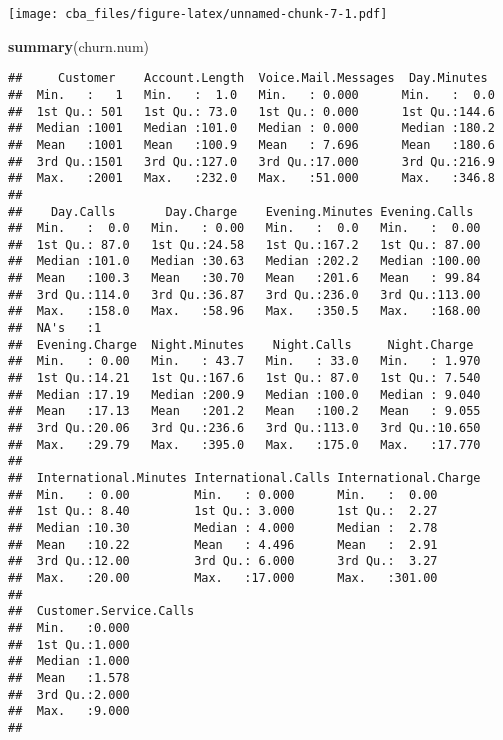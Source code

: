 \documentclass[]{article}
\newenvironment{Shaded}{\begin{snugshade}}{\end{snugshade}}
\newcommand{\KeywordTok}[1]{\textcolor[rgb]{0.13,0.29,0.53}{\textbf{#1}}}
\newcommand{\NormalTok}[1]{#1}
\begin{document}
\texttt{[image: cba\_files/figure-latex/unnamed-chunk-7-1.pdf]}

\begin{Shaded}
\begin{Highlighting}[]
\KeywordTok{summary}\NormalTok{(churn.num)}
\end{Highlighting}
\end{Shaded}

\begin{verbatim}
##     Customer    Account.Length  Voice.Mail.Messages  Day.Minutes   
##  Min.   :   1   Min.   :  1.0   Min.   : 0.000      Min.   :  0.0  
##  1st Qu.: 501   1st Qu.: 73.0   1st Qu.: 0.000      1st Qu.:144.6  
##  Median :1001   Median :101.0   Median : 0.000      Median :180.2  
##  Mean   :1001   Mean   :100.9   Mean   : 7.696      Mean   :180.6  
##  3rd Qu.:1501   3rd Qu.:127.0   3rd Qu.:17.000      3rd Qu.:216.9  
##  Max.   :2001   Max.   :232.0   Max.   :51.000      Max.   :346.8  
##                                                                    
##    Day.Calls       Day.Charge    Evening.Minutes Evening.Calls   
##  Min.   :  0.0   Min.   : 0.00   Min.   :  0.0   Min.   :  0.00  
##  1st Qu.: 87.0   1st Qu.:24.58   1st Qu.:167.2   1st Qu.: 87.00  
##  Median :101.0   Median :30.63   Median :202.2   Median :100.00  
##  Mean   :100.3   Mean   :30.70   Mean   :201.6   Mean   : 99.84  
##  3rd Qu.:114.0   3rd Qu.:36.87   3rd Qu.:236.0   3rd Qu.:113.00  
##  Max.   :158.0   Max.   :58.96   Max.   :350.5   Max.   :168.00  
##  NA's   :1                                                       
##  Evening.Charge  Night.Minutes    Night.Calls     Night.Charge   
##  Min.   : 0.00   Min.   : 43.7   Min.   : 33.0   Min.   : 1.970  
##  1st Qu.:14.21   1st Qu.:167.6   1st Qu.: 87.0   1st Qu.: 7.540  
##  Median :17.19   Median :200.9   Median :100.0   Median : 9.040  
##  Mean   :17.13   Mean   :201.2   Mean   :100.2   Mean   : 9.055  
##  3rd Qu.:20.06   3rd Qu.:236.6   3rd Qu.:113.0   3rd Qu.:10.650  
##  Max.   :29.79   Max.   :395.0   Max.   :175.0   Max.   :17.770  
##                                                                  
##  International.Minutes International.Calls International.Charge
##  Min.   : 0.00         Min.   : 0.000      Min.   :  0.00      
##  1st Qu.: 8.40         1st Qu.: 3.000      1st Qu.:  2.27      
##  Median :10.30         Median : 4.000      Median :  2.78      
##  Mean   :10.22         Mean   : 4.496      Mean   :  2.91      
##  3rd Qu.:12.00         3rd Qu.: 6.000      3rd Qu.:  3.27      
##  Max.   :20.00         Max.   :17.000      Max.   :301.00      
##                                                                
##  Customer.Service.Calls
##  Min.   :0.000         
##  1st Qu.:1.000         
##  Median :1.000         
##  Mean   :1.578         
##  3rd Qu.:2.000         
##  Max.   :9.000         
## 
\end{verbatim}
\end{document}
